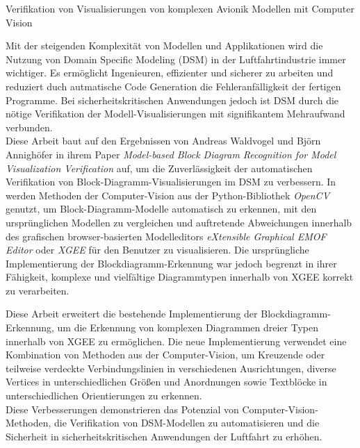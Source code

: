 \label{kurzzusammenfassung}
{\LARGE Verifikation von Visualisierungen von komplexen Avionik Modellen mit Computer Vision}

Mit der steigenden Komplexit{\"a}t von Modellen und Applikationen wird die Nutzung von Domain Specific Modeling (DSM) in der Luftfahrtindustrie immer wichtiger. Es erm{\"o}glicht Ingenieuren, effizienter und sicherer zu arbeiten und reduziert duch autmatische Code Generation die Fehleranf{\"a}lligkeit der fertigen Programme. Bei sicherheitskritischen Anwendungen jedoch ist DSM durch die n{\"o}tige Verifikation der Modell-Visualisierungen mit signifikantem Mehraufwand verbunden.\\
Diese Arbeit baut auf den Ergebnissen von Andreas Waldvogel und Bj{\"o}rn Annigh{\"o}fer in ihrem Paper \textit{Model-based Block Diagram Recognition for Model Visualization Verification} \cite{waldvogel_annighoefer_2024} auf, um die Zuverl{\"a}ssigkeit der automatischen Verifikation von Block-Diagramm-Visualisierungen im DSM zu verbessern. In \cite{waldvogel_annighoefer_2024} werden Methoden der Computer-Vision aus der Python-Bibliothek \textit{OpenCV} genutzt, um Block-Diagramm-Modelle automatisch zu erkennen, mit den urspr{\"u}nglichen Modellen zu vergleichen und auftretende Abweichungen innerhalb des grafischen browser-basierten Modelleditors \textit{eXtensible Graphical EMOF Editor} oder \textit{XGEE} f{\"u}r den Benutzer zu visualisieren. Die urspr{\"u}ngliche Implementierung der Blockdiagramm-Erkennung war jedoch begrenzt in ihrer F{\"a}higkeit, komplexe und vielf{\"a}ltige Diagrammtypen innerhalb von XGEE korrekt zu verarbeiten.

Diese Arbeit erweitert die bestehende Implementierung der Blockdiagramm-Erkennung, um die Erkennung von komplexen Diagrammen dreier Typen innerhalb von XGEE zu erm{\"o}glichen. Die neue Implementierung verwendet eine Kombination von Methoden aus der Computer-Vision, um Kreuzende oder teilweise verdeckte Verbindungslinien in verschiedenen Ausrichtungen, diverse Vertices in unterschiedlichen Gr{\"o}{\ss}en und Anordnungen sowie Textbl{\"o}cke in unterschiedlichen Orientierungen zu erkennen.\\
Diese Verbesserungen demonstrieren das Potenzial von Computer-Vision-Methoden, die Verifikation von DSM-Modellen zu automatisieren und die Sicherheit in sicherheitskritischen Anwendungen der Luftfahrt zu erh{\"o}hen.